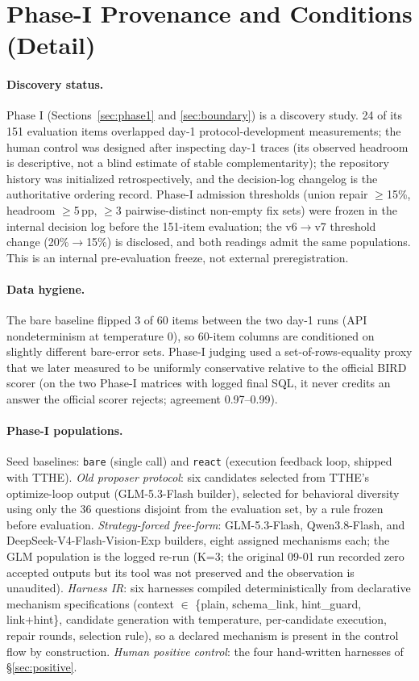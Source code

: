 \section{Phase-I Provenance and Conditions (Detail)}\label{app:phase1-provenance}

\paragraph{Discovery status.} Phase I (Sections~\ref{sec:phase1} and
\ref{sec:boundary}) is a discovery study. 24 of its 151 evaluation items
overlapped day-1 protocol-development measurements; the human control was
designed after inspecting day-1 traces (its observed headroom is descriptive,
not a blind estimate of stable complementarity); the repository history was initialized
retrospectively, and the decision-log changelog is the authoritative
ordering record. Phase-I admission thresholds (union repair
$\geq$15\%, headroom $\geq$5\,pp, $\geq$3 pairwise-distinct non-empty fix
sets) were frozen in the internal decision log before the 151-item
evaluation; the v6$\rightarrow$v7 threshold change (20\%$\rightarrow$15\%)
is disclosed, and both readings admit the same populations. This is an
internal pre-evaluation freeze, not external preregistration.

\paragraph{Data hygiene.} The bare baseline flipped 3 of 60 items between
the two day-1 runs (API nondeterminism at temperature 0), so 60-item
columns are conditioned on slightly different bare-error sets. Phase-I
judging used a set-of-rows-equality proxy that we later measured to be
uniformly conservative relative to the official BIRD scorer (on the two
Phase-I matrices with logged final SQL, it never credits an answer the
official scorer rejects; agreement 0.97--0.99).

\paragraph{Phase-I populations.} Seed baselines: \texttt{bare} (single
call) and \texttt{react} (execution feedback loop, shipped with TTHE).
\emph{Old proposer protocol}: six candidates selected from TTHE's
optimize-loop output (GLM-5.3-Flash builder), selected for behavioral
diversity using only the 36 questions disjoint from the evaluation set, by a
rule frozen before evaluation. \emph{Strategy-forced free-form}:
GLM-5.3-Flash, Qwen3.8-Flash, and DeepSeek-V4-Flash-Vision-Exp builders,
eight assigned mechanisms each; the GLM population
is the logged re-run (K=3; the original 09-01 run recorded zero accepted
outputs but its tool was not preserved and the observation is unaudited).
\emph{Harness IR}: six harnesses compiled deterministically from
declarative mechanism specifications (context $\in$
\{plain, schema\_link, hint\_guard, link+hint\}, candidate generation with
temperature, per-candidate execution, repair rounds, selection rule), so a
declared mechanism is present in the control flow by construction.
\emph{Human positive control}: the four hand-written harnesses of
\S\ref{sec:positive}.

